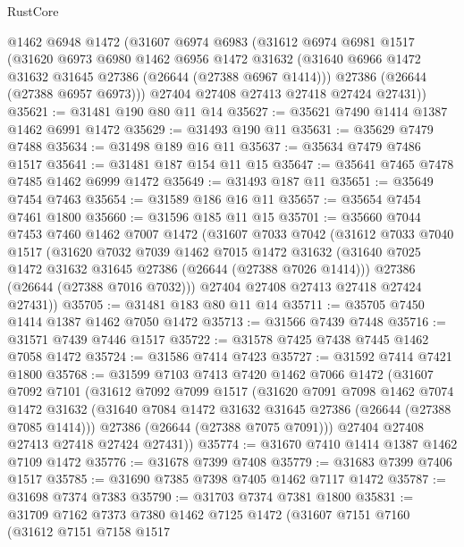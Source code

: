 \begin{lexlean}{RustCore}
\begin{coremodule}
    @1462
    @6948
    @1472
    (@31607
      @6974
      @6983
      (@31612
        @6974
        @6981
        @1517
        (@31620
          @6973
          @6980
          @1462
          @6956
          @1472
          @31632
          (@31640 @6966 @1472 @31632 @31645 @27386 (@26644 (@27388 @6967 @1414)))
          @27386
          (@26644 (@27388 @6957 @6973)))
        @27404
        @27408
        @27413
        @27418
        @27424
        @27431))
@35621 := @31481 @190 @80 @11 @14
@35627 := @35621 @7490 @1414 @1387 @1462 @6991 @1472
@35629 := @31493 @190 @11
@35631 := @35629 @7479 @7488
@35634 := @31498 @189 @16 @11
@35637 := @35634 @7479 @7486 @1517
@35641 := @31481 @187 @154 @11 @15
@35647 := @35641 @7465 @7478 @7485 @1462 @6999 @1472
@35649 := @31493 @187 @11
@35651 := @35649 @7454 @7463
@35654 := @31589 @186 @16 @11
@35657 := @35654 @7454 @7461 @1800
@35660 := @31596 @185 @11 @15
@35701 := @35660
    @7044
    @7453
    @7460
    @1462
    @7007
    @1472
    (@31607
      @7033
      @7042
      (@31612
        @7033
        @7040
        @1517
        (@31620
          @7032
          @7039
          @1462
          @7015
          @1472
          @31632
          (@31640 @7025 @1472 @31632 @31645 @27386 (@26644 (@27388 @7026 @1414)))
          @27386
          (@26644 (@27388 @7016 @7032)))
        @27404
        @27408
        @27413
        @27418
        @27424
        @27431))
@35705 := @31481 @183 @80 @11 @14
@35711 := @35705 @7450 @1414 @1387 @1462 @7050 @1472
@35713 := @31566 @7439 @7448
@35716 := @31571 @7439 @7446 @1517
@35722 := @31578 @7425 @7438 @7445 @1462 @7058 @1472
@35724 := @31586 @7414 @7423
@35727 := @31592 @7414 @7421 @1800
@35768 := @31599
    @7103
    @7413
    @7420
    @1462
    @7066
    @1472
    (@31607
      @7092
      @7101
      (@31612
        @7092
        @7099
        @1517
        (@31620
          @7091
          @7098
          @1462
          @7074
          @1472
          @31632
          (@31640 @7084 @1472 @31632 @31645 @27386 (@26644 (@27388 @7085 @1414)))
          @27386
          (@26644 (@27388 @7075 @7091)))
        @27404
        @27408
        @27413
        @27418
        @27424
        @27431))
@35774 := @31670 @7410 @1414 @1387 @1462 @7109 @1472
@35776 := @31678 @7399 @7408
@35779 := @31683 @7399 @7406 @1517
@35785 := @31690 @7385 @7398 @7405 @1462 @7117 @1472
@35787 := @31698 @7374 @7383
@35790 := @31703 @7374 @7381 @1800
@35831 := @31709
    @7162
    @7373
    @7380
    @1462
    @7125
    @1472
    (@31607
      @7151
      @7160
      (@31612
        @7151
        @7158
        @1517

\end{coremodule}
\end{lexlean}
